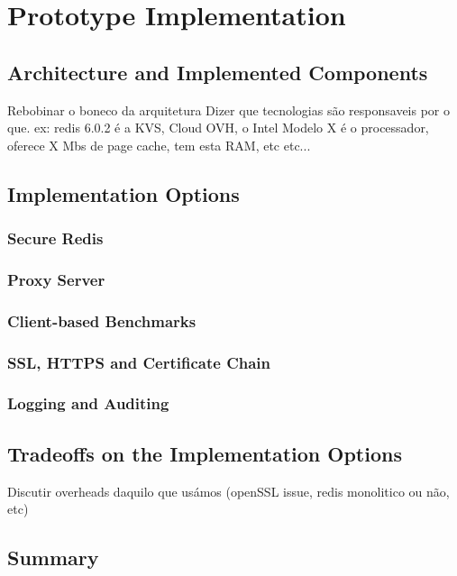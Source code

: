 
\chapter{Prototype Implementation}
\label{cha:elaboration_plan}

\section{Architecture and Implemented Components}
\label{sec:architecture_implementation_components}

Rebobinar o boneco da arquitetura
	Dizer que tecnologias são responsaveis por o que. ex: redis 6.0.2 é a KVS, Cloud OVH, o Intel Modelo X é o processador, oferece X Mbs de page cache, tem esta RAM, etc etc...

\section{Implementation Options}
\label{sec:implementation_options}

\subsection{Secure Redis}
\label{ssec:secure_redis}

\subsection{Proxy Server}
\label{ssec:proxy_server}

\subsection{Client-based Benchmarks}
\label{ssec:client_based_benchmarks}

\subsection{SSL, HTTPS and Certificate Chain}
\label{ssec:ssl_https_certificate_chain}

\subsection{Logging and Auditing} 
\label{sec:logging_and_auditing}

\section{Tradeoffs on the Implementation Options}
\label{sec:tradeoffs_implementation_options}

Discutir overheads daquilo que usámos (openSSL issue, redis monolitico ou não, etc)

\section{Summary}
\label{sec:summary}